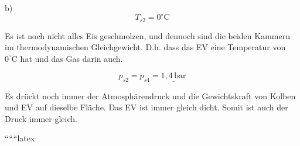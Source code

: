 b) 
\[
T_{s2} = 0^\circ \text{C}
\]

Es ist noch nicht alles Eis geschmolzen, und dennoch sind die beiden Kammern im thermodynamischen Gleichgewicht. D.h. dass das EV eine Temperatur von $0^\circ \text{C}$ hat und das Gas darin auch.

\[
p_{s2} = p_{s4} = \underline{1,4 \, \text{bar}}
\]

Es drückt noch immer der Atmosphärendruck und die Gewichtskraft von Kolben und EV auf dieselbe Fläche. Das EV ist immer gleich dicht. Somit ist auch der Druck immer gleich.

``````latex